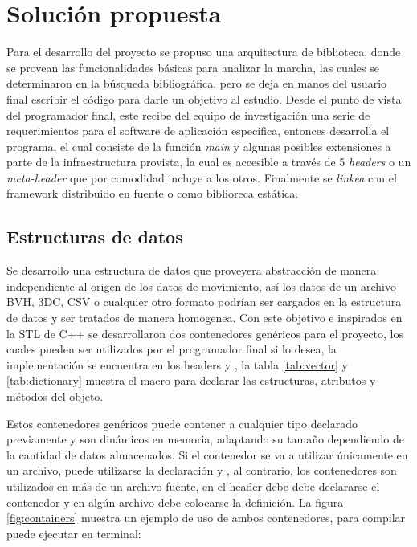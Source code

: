 \chapter{Solución propuesta}\label{chap:solucion}

Para el desarrollo del proyecto se propuso una arquitectura de biblioteca, donde se provean las funcionalidades básicas para analizar la marcha, las cuales se determinaron en la búsqueda bibliográfica, pero se deja en manos del usuario final escribir el código para darle un objetivo al estudio. Desde el punto de vista del programador final, este recibe del equipo de investigación una serie de requerimientos para el software de aplicación específica, entonces desarrolla el programa, el cual consiste de la función \emph{main} y algunas posibles extensiones a parte de la infraestructura provista, la cual es accesible a través de 5 \emph{headers} o un \emph{meta-header} que por comodidad incluye a los otros. Finalmente se \emph{linkea} con el framework distribuido en fuente o como biblioreca estática. 

\section{Estructuras de datos}

Se desarrollo una estructura de datos que proveyera abstracción de manera independiente al origen de los datos de movimiento, así los datos de un archivo BVH, 3DC, CSV o cualquier otro formato podrían ser cargados en la estructura de datos y ser tratados de manera homogenea. Con este objetivo e inspirados en la STL de C++ se desarrollaron dos contenedores genéricos para el proyecto, los cuales pueden ser utilizados por el programador final si lo desea, la implementación se encuentra en los headers  y , la tabla \ref{tab:vector} y \ref{tab:dictionary} muestra el macro para declarar las estructuras, atributos y métodos del objeto. 

Estos contenedores genéricos puede contener a cualquier tipo declarado previamente y son dinámicos en memoria, adaptando su tamaño dependiendo de la cantidad de datos almacenados. Si el contenedor se va a utilizar únicamente en un archivo, puede utilizarse la declaración  y , al contrario, los contenedores son utilizados en más de un archivo fuente, en el header debe debe declararse el contenedor y en algún archivo debe colocarse la definición. La figura \ref{fig:containers} muestra un ejemplo de uso de ambos contenedores, para compilar puede ejecutar en terminal:

